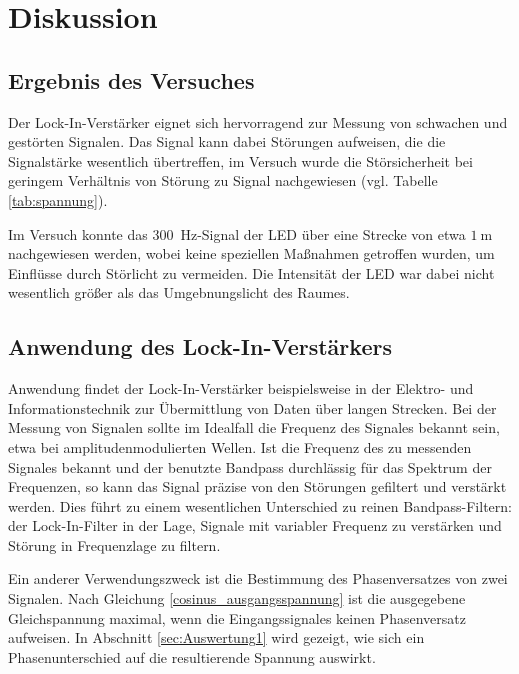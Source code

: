 \section{Diskussion}
\label{sec:Diskussion}

\subsection{Ergebnis des Versuches}
Der Lock-In-Verstärker eignet sich hervorragend zur Messung von schwachen und gestörten Signalen.
Das Signal kann dabei Störungen aufweisen, die die Signalstärke wesentlich übertreffen, im Versuch wurde die Störsicherheit bei geringem Verhältnis von Störung zu Signal nachgewiesen (vgl. Tabelle \ref{tab:spannung}).

Im Versuch konnte das \SI{300}{\hertz}-Signal der LED über eine Strecke von etwa $\SI{1}{\meter}$ nachgewiesen werden, wobei keine speziellen Maßnahmen getroffen wurden, um Einflüsse durch Störlicht zu vermeiden.
Die Intensität der LED war dabei nicht wesentlich größer als das Umgebnungslicht des Raumes.

\subsection{Anwendung des Lock-In-Verstärkers}
Anwendung findet der Lock-In-Verstärker beispielsweise in der Elektro- und Informationstechnik zur Übermittlung von Daten über langen Strecken.
Bei der Messung von Signalen sollte im Idealfall die Frequenz des Signales bekannt sein, etwa bei amplitudenmodulierten Wellen.
Ist die Frequenz des zu messenden Signales bekannt und der benutzte Bandpass durchlässig für das Spektrum der Frequenzen, so kann das Signal präzise von den Störungen gefiltert und verstärkt werden.
Dies führt zu einem wesentlichen Unterschied zu reinen Bandpass-Filtern:
der Lock-In-Filter in der Lage, Signale mit variabler Frequenz zu verstärken und Störung in Frequenzlage zu filtern. 

Ein anderer Verwendungszweck ist die Bestimmung des Phasenversatzes von zwei Signalen. 
Nach Gleichung \eqref{cosinus_ausgangsspannung} ist die ausgegebene Gleichspannung maximal, wenn die Eingangssignales keinen Phasenversatz aufweisen. 
In Abschnitt \ref{sec:Auswertung1} wird gezeigt, wie sich ein Phasenunterschied auf die resultierende Spannung auswirkt. 